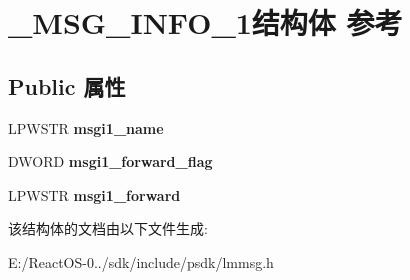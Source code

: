 \hypertarget{struct___m_s_g___i_n_f_o__1}{}\section{\+\_\+\+M\+S\+G\+\_\+\+I\+N\+F\+O\+\_\+1结构体 参考}
\label{struct___m_s_g___i_n_f_o__1}
\subsection*{Public 属性}
\begin{DoxyCompactItemize}
\item 
\mbox{\label{struct___m_s_g___i_n_f_o__1_a5bc1ac814326264d5ead1be93a6ada8c}} 
L\+P\+W\+S\+TR {\bfseries msgi1\+\_\+name}
\item 
\mbox{\label{struct___m_s_g___i_n_f_o__1_acfdc1f09914dfebac19a23c0a95e8629}} 
D\+W\+O\+RD {\bfseries msgi1\+\_\+forward\+\_\+flag}
\item 
\mbox{\label{struct___m_s_g___i_n_f_o__1_a3cc9c823bc10b0ba9fb869c54e7cd9b2}} 
L\+P\+W\+S\+TR {\bfseries msgi1\+\_\+forward}
\end{DoxyCompactItemize}


该结构体的文档由以下文件生成\+:\begin{DoxyCompactItemize}
\item 
E\+:/\+React\+O\+S-\/0../sdk/include/psdk/lmmsg.\+h\end{DoxyCompactItemize}
